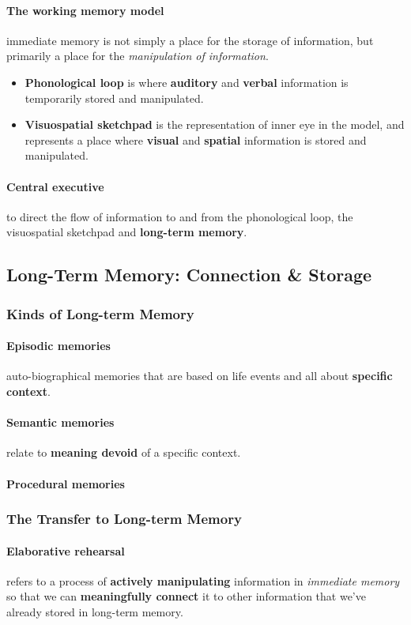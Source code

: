 \documentclass{article}
\begin{document}
	\paragraph{The working memory model} immediate memory is not simply a place for the storage of information, but primarily a place for the \emph{manipulation of information}.
	\begin{itemize}
		\item \textbf{Phonological loop} is where \textbf{auditory} and \textbf{verbal} information is temporarily stored and manipulated.	
		\item \textbf{Visuospatial sketchpad} is the representation of inner eye in the model, and represents a place where \textbf{visual} and \textbf{spatial} information is stored and manipulated.
	\end{itemize}
	\paragraph{Central executive} to direct the flow of information to and from the phonological loop, the visuospatial sketchpad and \textbf{long-term memory}.
	\subsection{Long-Term Memory: Connection \& Storage}
	\subsubsection{Kinds of Long-term Memory}
	\paragraph{Episodic memories} auto-biographical memories that are based on life events and all about \textbf{specific context}.
	\paragraph{Semantic memories} relate to \textbf{meaning devoid} of a specific context.
	\paragraph{Procedural memories}
	\subsubsection{The Transfer to Long-term Memory}
	\paragraph{Elaborative rehearsal} refers to a process of \textbf{actively manipulating} information in \emph{immediate memory} so that we can \textbf{meaningfully connect} it to other information that we've already stored in long-term memory.
\end{document}
